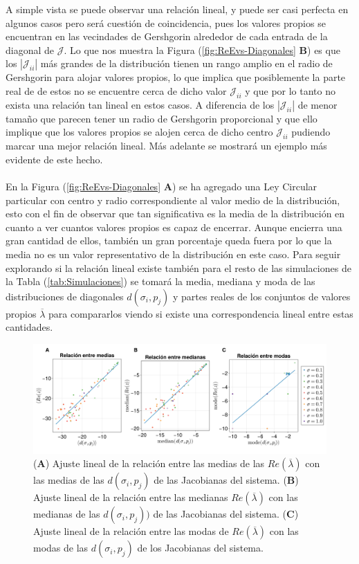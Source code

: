 A simple vista se puede observar una relación lineal, y puede ser casi perfecta en algunos casos pero será cuestión de coincidencia, pues los valores propios se encuentran en las vecindades de Gershgorin alrededor de cada entrada de la diagonal de $\mathcal{J}$. Lo que nos muestra la Figura (\ref{fig:ReEvs-Diagonales} \textbf{B}) es que los $|\mathcal{J}_{ii}|$ más grandes de la distribución tienen un rango amplio en el radio de Gershgorin para alojar valores propios, lo que implica que posiblemente la parte real de de estos no se encuentre cerca de dicho valor $\mathcal{J}_{ii}$ y que por lo tanto no exista una relación tan lineal en estos casos.  A diferencia de los $|\mathcal{J}_{ii}|$ de menor tamaño que parecen tener un radio de Gershgorin proporcional y que ello implique que los valores propios se alojen cerca de dicho centro $\mathcal{J}_{ii}$ pudiendo marcar una mejor relación lineal. Más adelante se mostrará un ejemplo más evidente de este hecho.\\
\\
En la Figura (\ref{fig:ReEvs-Diagonales} \textbf{A}) se ha agregado una Ley Circular particular con centro y radio correspondiente al valor medio de la distribución, esto con el fin de observar que tan significativa es la media de la distribución en cuanto a ver cuantos valores propios es capaz de encerrar. Aunque encierra una gran cantidad de ellos, también un gran porcentaje queda fuera por lo que la media no es un valor representativo de la distribución en este caso. Para seguir explorando si la relación lineal existe también para el resto de las simulaciones de la Tabla (\ref{tab:Simulaciones}) se tomará la media, mediana y moda de las distribuciones de diagonales $d(\sigma_i,p_j)$ y partes reales de los conjuntos de valores propios $\overline{\lambda}$ para compararlos viendo si existe una correspondencia lineal entre estas cantidades.
\begin{figure}[h!]
	\centering
	\includegraphics[scale=0.16]{../Imagenes/AjustesLinMeds}
	\caption{(\textbf{A}) Ajuste lineal de la relación entre las medias de las $Re(\overline{\lambda})$ con las medias de las $d(\sigma_i,p_j)$ de las Jacobianas del sistema. (\textbf{B}) Ajuste lineal de la relación entre las medianas $Re(\overline{\lambda})$ con las medianas de las $d(\sigma_i,p_j))$ de las Jacobianas del sistema. (\textbf{C}) Ajuste lineal de la relación entre las modas de $Re(\overline{\lambda})$ con las modas de las $d(\sigma_i,p_j)$ de los Jacobianas del sistema.}
	\label{fig:AjustesLinMeds}
\end{figure}

